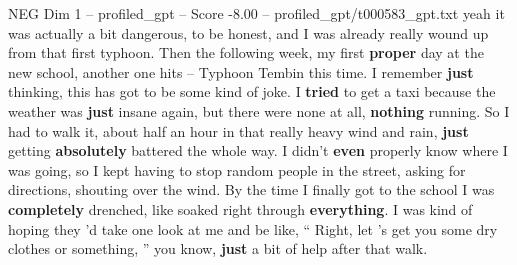 \begin{textsample}{NEG Dim 1 – profiled\_gpt – Score -8.00 – profiled\_gpt/t000583\_gpt.txt}  \label{ex:f1_neg_007}
yeah it was actually a bit dangerous, to be honest, and I was already really wound up from that first typhoon.
Then the following week, my first \textbf{proper} day at the new school, another one hits – Typhoon Tembin this time.
I remember \textbf{just} thinking, this has got to be some kind of joke.
I \textbf{tried} to get a taxi because the weather was \textbf{just} insane again, but there were none at all, \textbf{nothing} running.
So I had to walk it, about half an hour in that really heavy wind and rain, \textbf{just} getting \textbf{absolutely} battered the whole way.
I didn't \textbf{even} properly know where I was going, so I kept having to stop random people in the street, asking for directions, shouting over the wind.
By the time I finally got to the school I was \textbf{completely} drenched, like soaked right through \textbf{everything}.
I was kind of hoping they ’d take one look at me and be like, “ Right, let ’s get you some dry clothes or something, ” you know, \textbf{just} a bit of help after that walk.

\end{textsample}

